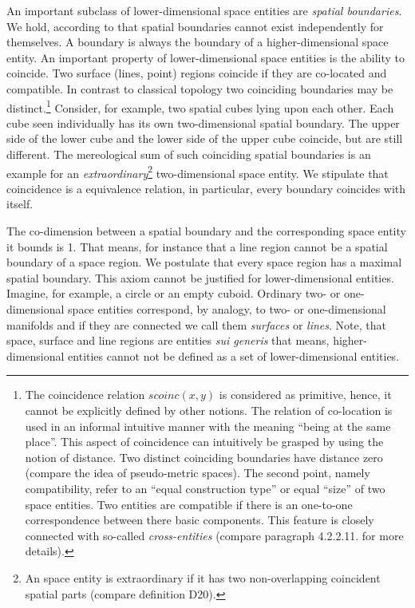 \documentclass{ao2e}
\begin{document}
{An important subclass of lower-dimensional space entities are \textit{spatial boundaries}. We hold, according to \cite{brentano-f-1976-a} that spatial boundaries cannot exist independently for themselves. A boundary is always the boundary of a higher-dimensional space entity. An important property of lower-dimensional space entities is the ability to coincide. Two surface (lines, point) regions coincide if they are co-located and compatible. In contrast to classical topology two coinciding boundaries may be distinct.\footnote{The coincidence relation $scoinc(x,y)$ is considered as primitive, hence, it cannot be explicitly defined by other notions. The relation of co-location is used in an informal intuitive manner with the meaning ``being at the same place''. This aspect of coincidence can intuitively be grasped by using the notion of distance. Two distinct coinciding boundaries have distance zero (compare the idea of pseudo-metric spaces). The second point, namely compatibility, refer to an ``equal construction type'' or equal ``size'' of two space entities. Two entities are compatible if there is an one-to-one correspondence between there basic components. This feature is closely connected with so-called \textit{cross-entities} (compare paragraph 4.2.2.11. for more details).}  Consider, for example, two spatial cubes lying upon each other. Each cube seen individually has its own two-dimensional spatial boundary. The upper side of the lower cube and the lower side of the upper cube coincide, but are still different. The mereological sum of such coinciding spatial boundaries is an example for an \textit{extraordinary}\footnote{An space entity is extraordinary if it has two non-overlapping coincident spatial parts (compare definition D20).} two-dimensional space entity. We stipulate that coincidence is a equivalence relation, in particular, every boundary coincides with itself.
  
The co-dimension between a spatial boundary and the corresponding space entity it bounds is 1. That means, for instance that a line region cannot be a spatial boundary of a space region. We postulate that every space region has a maximal
spatial boundary. This axiom cannot be justified for lower-dimensional entities. Imagine, for example,  a circle or an empty cuboid. Ordinary two- or one-dimensional space entities correspond, by analogy, to two- or one-dimensional manifolds and if they are connected we call them
\textit{surfaces} or \textit{lines}. Note,  that space, surface and line regions are entities \textit{sui generis} that means, higher-dimensional entities cannot not be defined as a set of lower-dimensional entities.

}
\end{document}
